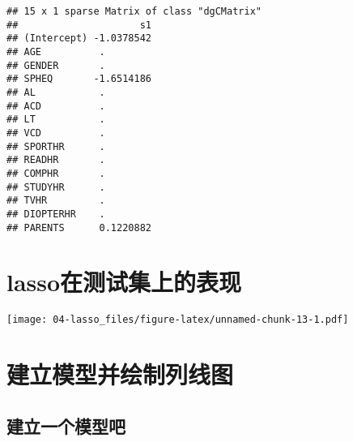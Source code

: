 \documentclass[]{ctexbook}
\newenvironment{Shaded}{\begin{snugshade}}{\end{snugshade}}
\newcommand{\AttributeTok}[1]{\textcolor[rgb]{0.77,0.63,0.00}{#1}}
\newcommand{\DecValTok}[1]{\textcolor[rgb]{0.00,0.00,0.81}{#1}}
\newcommand{\FloatTok}[1]{\textcolor[rgb]{0.00,0.00,0.81}{#1}}
\newcommand{\FunctionTok}[1]{\textcolor[rgb]{0.00,0.00,0.00}{#1}}
\newcommand{\NormalTok}[1]{#1}
\newcommand{\OtherTok}[1]{\textcolor[rgb]{0.56,0.35,0.01}{#1}}
\newcommand{\SpecialCharTok}[1]{\textcolor[rgb]{0.00,0.00,0.00}{#1}}
\newcommand{\StringTok}[1]{\textcolor[rgb]{0.31,0.60,0.02}{#1}}
\begin{document}
\begin{verbatim}
## 15 x 1 sparse Matrix of class "dgCMatrix"
##                     s1
## (Intercept) -1.0378542
## AGE          .        
## GENDER       .        
## SPHEQ       -1.6514186
## AL           .        
## ACD          .        
## LT           .        
## VCD          .        
## SPORTHR      .        
## READHR       .        
## COMPHR       .        
## STUDYHR      .        
## TVHR         .        
## DIOPTERHR    .        
## PARENTS      0.1220882
\end{verbatim}

\hypertarget{lassoux5728ux6d4bux8bd5ux96c6ux4e0aux7684ux8868ux73b0}{%
\section{lasso在测试集上的表现}\label{lassoux5728ux6d4bux8bd5ux96c6ux4e0aux7684ux8868ux73b0}}

\begin{Shaded}
\end{Shaded}

\texttt{[image: 04-lasso\_files/figure-latex/unnamed-chunk-13-1.pdf]}

\hypertarget{ux5efaux7acbux6a21ux578bux5e76ux7ed8ux5236ux5217ux7ebfux56fe}{%
\section{建立模型并绘制列线图}\label{ux5efaux7acbux6a21ux578bux5e76ux7ed8ux5236ux5217ux7ebfux56fe}}

\hypertarget{ux5efaux7acbux4e00ux4e2aux6a21ux578bux5427}{%
\subsection{建立一个模型吧}\label{ux5efaux7acbux4e00ux4e2aux6a21ux578bux5427}}
\end{document}
